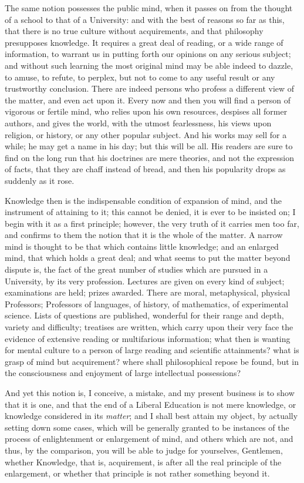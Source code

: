 The same notion possesses the public mind, when it passes on from
the thought of a school to that of a University: and with the best of
reasons so far as this, that there is no true culture without
acquirements, and that philosophy presupposes knowledge. It requires a
great deal of reading, or a wide range of information, to warrant us
in putting forth our opinions on any serious subject; and without such
learning the most original mind may be able indeed to dazzle, to
amuse, to refute, to perplex, but not to come to any useful result or
any trustworthy conclusion. There are indeed persons who profess a
different view of the matter, and even act upon it. Every now and then
you will find a person of vigorous or fertile mind, who relies upon
his own resources, despises all former authors, and gives the world,
with the utmost fearlessness, his views upon religion, or history, or
any other popular subject. And his works may sell for a while; he may
get a name in his day; but this will be all. His readers are sure to
find on the long run that his doctrines are mere theories, and not the
expression of facts, that they are chaff instead of bread, and then
his popularity drops as suddenly as it rose.

Knowledge then is the indispensable condition of expansion of mind,
and the instrument of attaining to it; this cannot be denied, it is
ever to be insisted on; I begin with it as a first principle; however,
the very truth of it carries men too far, and confirms to them the
notion that it is the whole of the matter. A narrow mind is thought to
be that which contains little knowledge; and an enlarged mind, that
which holds a great deal; and what seems to put the matter beyond
dispute is, the fact of the great number of studies which are
pursued in a University, by its very profession. Lectures are given on
every kind of subject; examinations are held; prizes awarded. There
are moral, metaphysical, physical Professors; Professors of languages,
of history, of mathematics, of experimental science. Lists of
questions are published, wonderful for their range and depth, variety
and difficulty; treatises are written, which carry upon their very
face the evidence of extensive reading or multifarious information;
what then is wanting for mental culture to a person of large reading
and scientific attainments? what is grasp of mind but acquirement?
where shall philosophical repose be found, but in the consciousness
and enjoyment of large intellectual possessions?

And yet this notion is, I conceive, a mistake, and my present
business is to show that it is one, and that the end of a Liberal
Education is not mere knowledge, or knowledge considered in its \emph{matter};
and I shall best attain my object, by actually setting down some
cases, which will be generally granted to be instances of the process
of enlightenment or enlargement of mind, and others which are not, and
thus, by the comparison, you will be able to judge for yourselves,
Gentlemen, whether Knowledge, that is, acquirement, is after all the
real principle of the enlargement, or whether that principle is not
rather something beyond it.

